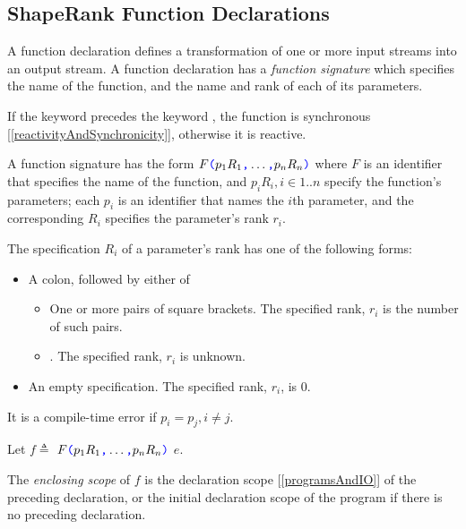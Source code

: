 \documentclass{article}
\begin{document}
\subsection{ShapeRank Function Declarations}
\label{shapeRankFunctionDeclarations}

\FunctionDeclaration

A function declaration defines a transformation of one or more input streams into an output stream. A function declaration has a
{\em function signature} which specifies the name of the function, and the name and rank of each of its parameters.

If the keyword \SYNC precedes the keyword \FUNC, the function is synchronous [\ref{reactivityAndSynchronicity}], otherwise it is reactive.

\FunctionSignature{}

\ParameterList{}

\Parameter{}

\RankSigSuffix{}

\RankSig{}

A function signature has the form  $F\texttt{\color{blue} (}{}p_1 R_1\texttt{\color{blue} ,}{} \ldots\texttt{\color{blue} ,}{} p_n R_n\texttt{\color{blue} )}{}$ where $F$ is an identifier that specifies the name of the function, and $p_i  R_i,  i \in 1..n$ specify the function's parameters; each $p_i$ is an identifier that names the $i$th parameter, and the corresponding $R_i$ specifies the parameter's rank $r_i$.  

The specification $R_i$ of a parameter's rank has one of the following forms:
\begin{itemize}
\item A colon, followed by either of 
\begin{itemize}
\item One or more pairs of square brackets. The specified rank, $r_i$ is the number of such pairs.
\item \QUESTIONMARK{}.  The specified rank, $r_i$ is unknown.
\end{itemize}
\item An empty specification. The specified rank, $r_i$, is 0.
\end{itemize}

It is a compile-time error if $p_i = p_j, i \ne j$.

Let $f \triangleq$ \FUNC{} $F\texttt{\color{blue} (}{}p_1 R_1\texttt{\color{blue} ,}{} \ldots\texttt{\color{blue} ,}{} p_n R_n\texttt{\color{blue} )}{}$  \BIND{} $e$.

The {\em enclosing scope} of $f$ is the declaration scope [\ref{programsAndIO}] of the preceding declaration, or the initial declaration scope of the program if there is no preceding declaration.
\end{document}
